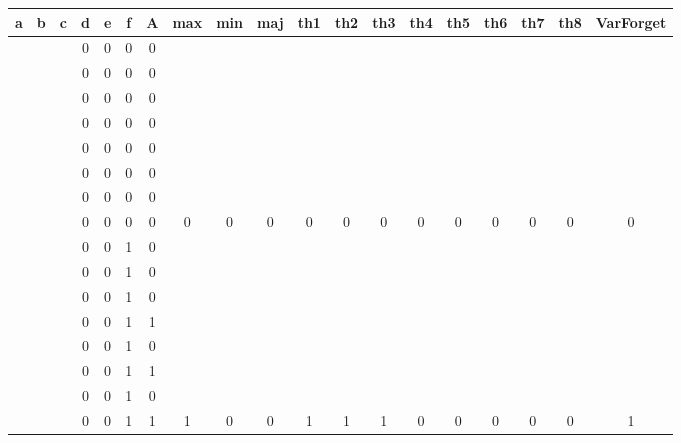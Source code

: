 \begin{table}[!tb]
    \centering
    \begin{tabular}{|c|c|c|c|c|c|c|c|c|c|c|c|c|c|c|c|c|c|c|}
        \hline
        \textbf{a} & \textbf{b} & \textbf{c} & \textbf{d} & \textbf{e} & \textbf{f} & \textbf{A} & \textbf{max} & \textbf{min} & \textbf{maj} & \textbf{th1} & \textbf{th2} & \textbf{th3} & \textbf{th4} & \textbf{th5} & \textbf{th6} & \textbf{th7} & \textbf{th8} & \textbf{VarForget} \\ \hline
        \rowcolor{gray!40}  &  &  & 0 & 0 & 0 & 0 &  &  &  &  &  &  &  &  &  &  &  &  \\ \hline
        \rowcolor{gray!40}  &  &  & 0 & 0 & 0 & 0 &  &  &  &  &  &  &  &  &  &  &  &  \\ \hline
        \rowcolor{gray!40}  &  &  & 0 & 0 & 0 & 0 &  &  &  &  &  &  &  &  &  &  &  &  \\ \hline
        \rowcolor{gray!40}  &  &  & 0 & 0 & 0 & 0 &  &  &  &  &  &  &  &  &  &  &  &  \\ \hline
        \rowcolor{gray!40}  &  &  & 0 & 0 & 0 & 0 &  &  &  &  &  &  &  &  &  &  &  &  \\ \hline
        \rowcolor{gray!40}  &  &  & 0 & 0 & 0 & 0 &  &  &  &  &  &  &  &  &  &  &  &  \\ \hline
        \rowcolor{gray!40}  &  &  & 0 & 0 & 0 & 0 &  &  &  &  &  &  &  &  &  &  &  &  \\ \hline
        \rowcolor{gray!40}  &  &  & 0 & 0 & 0 & 0 & 0 & 0 & 0 & 0 & 0 & 0 & 0 & 0 & 0 & 0 & 0 & 0 \\ \hline
        \rowcolor{blue!40}  &  &  & 0 & 0 & 1 & 0 &  &  &  &  &  &  &  &  &  &  &  &  \\ \hline
        \rowcolor{blue!40}  &  &  & 0 & 0 & 1 & 0 &  &  &  &  &  &  &  &  &  &  &  &  \\ \hline
        \rowcolor{blue!40}  &  &  & 0 & 0 & 1 & 0 &  &  &  &  &  &  &  &  &  &  &  &  \\ \hline
        \rowcolor{blue!40}  &  &  & 0 & 0 & 1 & 1 &  &  &  &  &  &  &  &  &  &  &  &  \\ \hline
        \rowcolor{blue!40}  &  &  & 0 & 0 & 1 & 0 &  &  &  &  &  &  &  &  &  &  &  &  \\ \hline
        \rowcolor{blue!40}  &  &  & 0 & 0 & 1 & 1 &  &  &  &  &  &  &  &  &  &  &  &  \\ \hline
        \rowcolor{blue!40}  &  &  & 0 & 0 & 1 & 0 &  &  &  &  &  &  &  &  &  &  &  &  \\ \hline
        \rowcolor{blue!40}  &  &  & 0 & 0 & 1 & 1 & 1 & 0 & 0 & 1 & 1 & 1 & 0 & 0 & 0 & 0 & 0 & 1 \\ \hline

\end{tabular}
\end{table}
